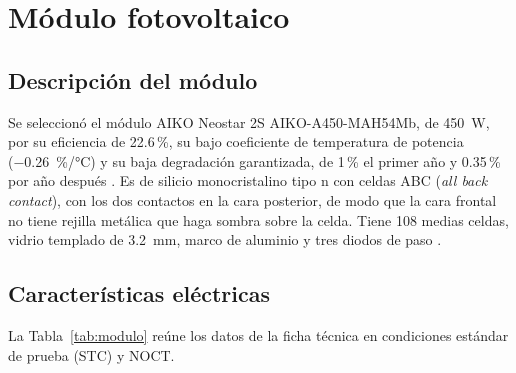 \section{Módulo fotovoltaico}\label{sec:modulo}

\subsection{Descripción del módulo}

Se seleccionó el módulo AIKO Neostar 2S AIKO-A450-MAH54Mb, de \SI{450}{W}, por su eficiencia de 22.6\,\%, su bajo coeficiente de temperatura de potencia (\SI{-0.26}{\%/\celsius}) y su baja degradación garantizada, de 1\,\% el primer año y 0.35\,\% por año después \cite{aiko_ds}. Es de silicio monocristalino tipo n con celdas ABC (\emph{all back contact}), con los dos contactos en la cara posterior, de modo que la cara frontal no tiene rejilla metálica que haga sombra sobre la celda. Tiene 108 medias celdas, vidrio templado de \SI{3.2}{mm}, marco de aluminio y tres diodos de paso \cite{aiko_ds}.

\subsection{Características eléctricas}

La Tabla~\ref{tab:modulo} reúne los datos de la ficha técnica en condiciones estándar de prueba (STC) y NOCT.

